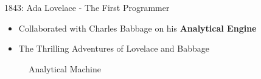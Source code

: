 \documentclass{beamer}
\begin{document}
\begin{frame}[t]{1843: Ada Lovelace - The First Programmer}
        \begin{itemize}
            \item Collaborated with Charles Babbage on his \textbf{Analytical Engine}
            \item The Thrilling Adventures of Lovelace and Babbage
        \end{itemize}


        \begin{figure}[b]
        \centering
          \qquad    


        \caption{Analytical Machine}
        \end{figure}
\end{frame}
\end{document}
